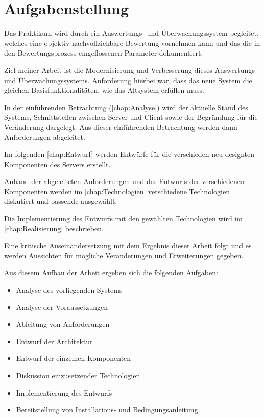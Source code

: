 \section{Aufgabenstellung}
\label{sec:Aufgabenstellung}
Das Praktikum wird durch ein Auswertungs- und Überwachungssystem begleitet, welches eine objektiv nachvollziehbare Bewertung vornehmen kann und das die in den Bewertungsprozess eingeflossenen Parameter dokumentiert. \cite[S. 2]{sosnaKonzeptionUndRealisierung2010}

Ziel meiner Arbeit ist die Modernisierung und Verbesserung dieses Auswertungs- und Überwachungssystems. Anforderung hierbei war, dass das neue System die gleichen Basisfunktionalitäten, wie das Altsystem erfüllen muss.

In der einführenden Betrachtung (\autoref{chap:Analyse}) wird der aktuelle Stand des Systems, Schnittstellen zwischen Server und Client sowie der Begründung für die Veränderung dargelegt. Aus dieser einführenden Betrachtung werden dann Anforderungen abgeleitet.

Im folgenden \autoref{chap:Entwurf} werden Entwürfe für die verschieden neu designten Komponenten des Servers erstellt. 

Anhand der abgeleiteten Anforderungen und des Entwurfs der verschiedenen Komponenten werden im \autoref{chap:Technologien} verschiedene Technologien diskutiert und passende ausgewählt.

Die Implementierung des Entwurfs mit den gewählten Technologien wird im \autoref{chap:Realisierung} beschrieben.

Eine kritische Auseinandersetzung mit dem Ergebnis dieser Arbeit folgt und es werden Aussichten für mögliche Veränderungen und Erweiterungen gegeben.

Aus diesem Aufbau der Arbeit ergeben sich die folgenden Aufgaben:
\begin{itemize}
	\item Analyse des vorliegenden Systems
	\item Analyse der Voraussetzungen
	\item Ableitung von Anforderungen
	\item Entwurf der Architektur
	\item Entwurf der einzelnen Komponenten
	\item Diskussion einzusetzender Technologien
	\item Implementierung des Entwurfs
	\item Bereitstellung von Installations- und Bedingungsanleitung.
\end{itemize}